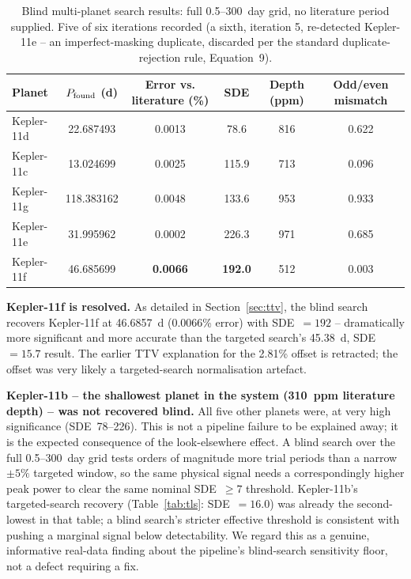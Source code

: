 \documentclass[11pt]{article}
\begin{document}
\begin{table}[h]
\centering
\caption{Blind multi-planet search results: full 0.5--300~day grid, no literature period supplied. Five of six iterations recorded (a sixth, iteration 5, re-detected Kepler-11e -- an imperfect-masking duplicate, discarded per the standard duplicate-rejection rule, Equation~9).}
\label{tab:blind}
\begin{tabular}{lccccc}
\toprule
Planet & $P_{\rm found}$ (d) & Error vs. literature (\%) & SDE & Depth (ppm) & Odd/even mismatch \\
\midrule
Kepler-11d & 22.687493 & 0.0013 & 78.6  & 816 & 0.622 \\
Kepler-11c & 13.024699 & 0.0025 & 115.9 & 713 & 0.096 \\
Kepler-11g & 118.383162 & 0.0048 & 133.6 & 953 & 0.933 \\
Kepler-11e & 31.995962 & 0.0002 & 226.3 & 971 & 0.685 \\
Kepler-11f & 46.685699 & \textbf{0.0066} & \textbf{192.0} & 512 & 0.003 \\
\bottomrule
\end{tabular}
\end{table}

\textbf{Kepler-11f is resolved.} As detailed in Section~\ref{sec:ttv}, the blind search recovers Kepler-11f at 46.6857~d (0.0066\% error) with SDE~$=192$ -- dramatically more significant and more accurate than the targeted search's 45.38~d, SDE~$=15.7$ result. The earlier TTV explanation for the 2.81\% offset is retracted; the offset was very likely a targeted-search normalisation artefact.

\textbf{Kepler-11b -- the shallowest planet in the system (310~ppm literature depth) -- was not recovered blind.} All five other planets were, at very high significance (SDE~78--226). This is not a pipeline failure to be explained away; it is the expected consequence of the look-elsewhere effect. A blind search over the full 0.5--300~day grid tests orders of magnitude more trial periods than a narrow $\pm5\%$ targeted window, so the same physical signal needs a correspondingly higher peak power to clear the same nominal SDE~$\ge7$ threshold. Kepler-11b's targeted-search recovery (Table~\ref{tab:tls}: SDE~$=16.0$) was already the second-lowest in that table; a blind search's stricter effective threshold is consistent with pushing a marginal signal below detectability. We regard this as a genuine, informative real-data finding about the pipeline's blind-search sensitivity floor, not a defect requiring a fix.
\end{document}
